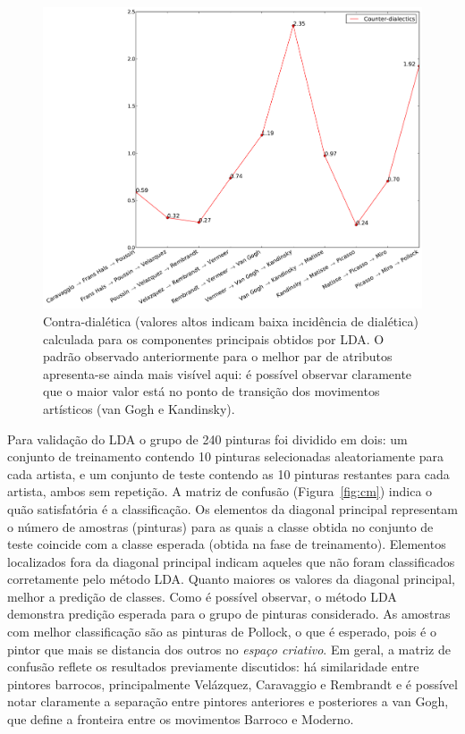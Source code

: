 \begin{figure}[h!]
\begin{center}
        \includegraphics[width=\columnwidth]{figs/caso3_dialetica}
      \caption{Contra-dialética (valores altos indicam baixa
        incidência de dialética) calculada para os componentes principais
        obtidos por LDA. O padrão observado anteriormente para o melhor par de
        atributos apresenta-se ainda mais visível aqui: é possível observar
        claramente que o maior valor está no ponto de transição dos movimentos
        artísticos (van Gogh e Kandinsky).}
        \label{fig:caso3_dialetica}
\end{center}
\end{figure}

Para validação do LDA o grupo de 240 pinturas foi dividido em dois: um conjunto
de treinamento contendo 10 pinturas selecionadas aleatoriamente para cada
artista, e um conjunto de teste contendo as 10 pinturas restantes para cada
artista, ambos sem repetição. A matriz de confusão
(Figura~\ref{fig:cm}) indica o quão satisfatória é a classificação. Os elementos
da diagonal principal representam o número de amostras (pinturas) para as quais
a classe obtida no conjunto de teste coincide com a classe esperada (obtida na
fase de treinamento). Elementos localizados fora da diagonal principal indicam
aqueles que não foram classificados corretamente pelo método LDA. Quanto maiores
os valores da diagonal principal, melhor a predição de classes. Como é possível
observar, o método LDA demonstra predição esperada para o grupo de pinturas
considerado. As amostras com melhor classificação são as pinturas de Pollock, o
que é esperado, pois é o pintor que mais se distancia dos outros no
\textit{espaço criativo}. Em geral, a matriz de confusão reflete os resultados
previamente discutidos: há similaridade entre pintores barrocos, principalmente
Velázquez, Caravaggio e Rembrandt e é possível notar claramente a separação
entre pintores anteriores e posteriores a van Gogh, que define a fronteira entre os
movimentos Barroco e Moderno.

